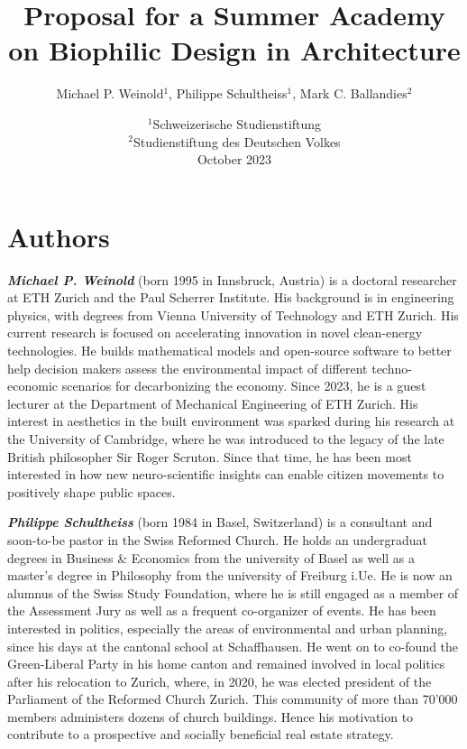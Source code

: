 \documentclass{article}
\title{Proposal for a Summer Academy \protect\\ on Biophilic Design in Architecture}
\author{Michael P. Weinold$^1$, Philippe Schultheiss$^1$, Mark C. Ballandies$^2$}
\date{
    $^1$Schweizerische Studienstiftung \\
    $^2$Studienstiftung des Deutschen Volkes \\[3mm]
    October 2023
}
\begin{document}
\maketitle

\section*{\centering Authors}

\textbf{\textit{Michael P. Weinold}} (born 1995 in Innsbruck, Austria) is a doctoral researcher at ETH Zurich and the Paul Scherrer Institute. His background is in engineering physics, with degrees from Vienna University of Technology and ETH Zurich. His current research is focused on accelerating innovation in novel clean-energy technologies. He builds mathematical models and open-source software to better help decision makers assess the environmental impact of different techno-economic scenarios for decarbonizing the economy. Since 2023, he is a guest lecturer at the Department of Mechanical Engineering of ETH Zurich. His interest in aesthetics in the built environment was sparked during his research at the University of Cambridge, where he was introduced to the legacy of the late British philosopher Sir Roger Scruton. Since that time, he has been most interested in how new neuro-scientific insights can enable citizen movements to positively shape public spaces.

\textbf{\textit{Philippe Schultheiss}} (born 1984 in Basel, Switzerland) is a consultant and soon-to-be pastor in the Swiss Reformed Church. He holds an undergraduat degrees in Business \& Economics from the university of Basel as well as a master's degree in Philosophy from the university of Freiburg i.Ue. He is now an alumnus of the Swiss Study Foundation, where he is still engaged as a member of the Assessment Jury as well as a frequent co-organizer of events. He has been interested in politics, especially the areas of environmental and urban planning, since his days at the cantonal school at Schaffhausen. He went on to co-found the Green-Liberal Party in his home canton and remained involved in local politics after his relocation to Zurich, where, in 2020, he was elected president of the Parliament of the Reformed Church Zurich. This community of more than 70'000 members administers dozens of church buildings. Hence his motivation to contribute to a prospective and socially beneficial real estate strategy.
\end{document}
